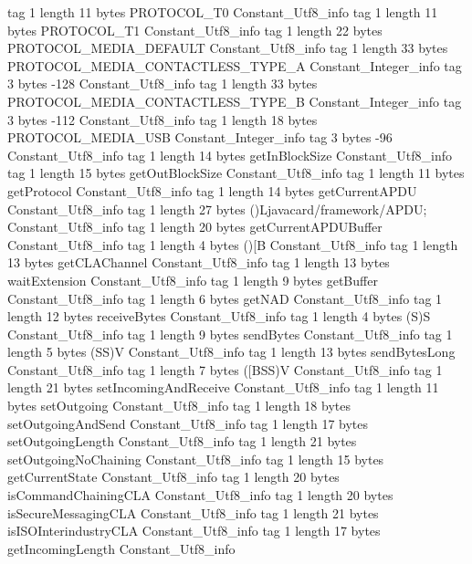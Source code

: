 {{{			tag	1
			length	11
			bytes	PROTOCOL_T0
		}
		Constant_Utf8_info {
			tag	1
			length	11
			bytes	PROTOCOL_T1
		}
		Constant_Utf8_info {
			tag	1
			length	22
			bytes	PROTOCOL_MEDIA_DEFAULT
		}
		Constant_Utf8_info {
			tag	1
			length	33
			bytes	PROTOCOL_MEDIA_CONTACTLESS_TYPE_A
		}
		Constant_Integer_info {
			tag	3
			bytes	-128
		}
		Constant_Utf8_info {
			tag	1
			length	33
			bytes	PROTOCOL_MEDIA_CONTACTLESS_TYPE_B
		}
		Constant_Integer_info {
			tag	3
			bytes	-112
		}
		Constant_Utf8_info {
			tag	1
			length	18
			bytes	PROTOCOL_MEDIA_USB
		}
		Constant_Integer_info {
			tag	3
			bytes	-96
		}
		Constant_Utf8_info {
			tag	1
			length	14
			bytes	getInBlockSize
		}
		Constant_Utf8_info {
			tag	1
			length	15
			bytes	getOutBlockSize
		}
		Constant_Utf8_info {
			tag	1
			length	11
			bytes	getProtocol
		}
		Constant_Utf8_info {
			tag	1
			length	14
			bytes	getCurrentAPDU
		}
		Constant_Utf8_info {
			tag	1
			length	27
			bytes	()Ljavacard/framework/APDU;
		}
		Constant_Utf8_info {
			tag	1
			length	20
			bytes	getCurrentAPDUBuffer
		}
		Constant_Utf8_info {
			tag	1
			length	4
			bytes	()[B
		}
		Constant_Utf8_info {
			tag	1
			length	13
			bytes	getCLAChannel
		}
		Constant_Utf8_info {
			tag	1
			length	13
			bytes	waitExtension
		}
		Constant_Utf8_info {
			tag	1
			length	9
			bytes	getBuffer
		}
		Constant_Utf8_info {
			tag	1
			length	6
			bytes	getNAD
		}
		Constant_Utf8_info {
			tag	1
			length	12
			bytes	receiveBytes
		}
		Constant_Utf8_info {
			tag	1
			length	4
			bytes	(S)S
		}
		Constant_Utf8_info {
			tag	1
			length	9
			bytes	sendBytes
		}
		Constant_Utf8_info {
			tag	1
			length	5
			bytes	(SS)V
		}
		Constant_Utf8_info {
			tag	1
			length	13
			bytes	sendBytesLong
		}
		Constant_Utf8_info {
			tag	1
			length	7
			bytes	([BSS)V
		}
		Constant_Utf8_info {
			tag	1
			length	21
			bytes	setIncomingAndReceive
		}
		Constant_Utf8_info {
			tag	1
			length	11
			bytes	setOutgoing
		}
		Constant_Utf8_info {
			tag	1
			length	18
			bytes	setOutgoingAndSend
		}
		Constant_Utf8_info {
			tag	1
			length	17
			bytes	setOutgoingLength
		}
		Constant_Utf8_info {
			tag	1
			length	21
			bytes	setOutgoingNoChaining
		}
		Constant_Utf8_info {
			tag	1
			length	15
			bytes	getCurrentState
		}
		Constant_Utf8_info {
			tag	1
			length	20
			bytes	isCommandChainingCLA
		}
		Constant_Utf8_info {
			tag	1
			length	20
			bytes	isSecureMessagingCLA
		}
		Constant_Utf8_info {
			tag	1
			length	21
			bytes	isISOInterindustryCLA
		}
		Constant_Utf8_info {
			tag	1
			length	17
			bytes	getIncomingLength
		}
		Constant_Utf8_info {
}}}
